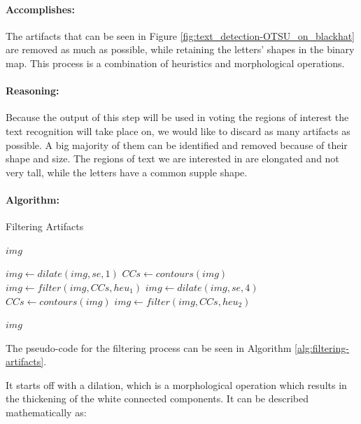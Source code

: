\paragraph*{Accomplishes:}\mbox{}\par
The artifacts that can be seen in Figure \ref{fig:text_detection-OTSU_on_blackhat} are removed as much as possible, while retaining the letters' shapes in the binary map. This process is a combination of heuristics and morphological operations.

\paragraph*{Reasoning:}\mbox{}\par
Because the output of this step will be used in voting the regions of interest the text recognition will take place on, we would like to discard as many artifacts as possible. A big majority of them can be identified and removed because of their shape and size. The regions of text we are interested in are elongated and not very tall, while the letters have a common supple shape.

\paragraph*{Algorithm:}\mbox{}\par

\begin{algorithm}
    \caption{Filtering Artifacts}\label{alg:filtering-artifacts}
    \begin{algorithmic}[1]
        \Require $img$

        \State $img \gets dilate(img, se, 1)$
        \State $CCs \gets contours(img)$\label{alg:filtering-artifacts:contours-1}
        \State $img \gets filter(img, CCs, heu_1)$\label{alg:filtering-artifacts:filter-1}
        \State $img \gets dilate(img, se, 4)$
        \State $CCs \gets contours(img)$
        \State $img \gets filter(img, CCs, heu_2)$\label{alg:filtering-artifacts:filter-2}

        \State \Return $img$
    \end{algorithmic}
\end{algorithm}

The pseudo-code for the filtering process can be seen in Algorithm \ref{alg:filtering-artifacts}.

It starts off with a dilation, which is a morphological operation \cite{article:mathematical-morphology} which results in the thickening of the white connected components. It can be described mathematically as:

